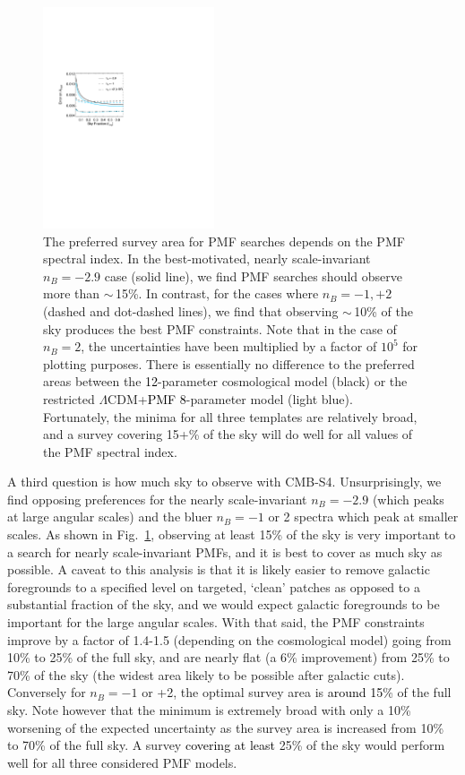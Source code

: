 \documentclass[apj]{emulateapj}
\newcommand{\lcdm}{\ensuremath{\Lambda}CDM}
\newcommand{\changed}[1]{\textcolor{Black}{#1}}
\begin{document}
\begin{figure}[htb]\centering
\includegraphics[width=0.45\textwidth,clip,trim={2.cm 12.5cm 11cm 7.5cm}]{pmf_area.pdf}
  \caption[Area dependence]{
  The preferred survey area for PMF searches depends on the PMF spectral index. 
    In the best-motivated, nearly scale-invariant $n_B = -2.9$ case (solid line), we find PMF searches should observe more than $\sim$\,15\%. 
 In contrast, for the cases where $n_B = -1, +2$ (dashed and dot-dashed lines), we find that observing  $\sim$\,10\% of the sky produces the best PMF constraints. 
   Note that in the case of $n_B=2$, the uncertainties have been multiplied by a factor of $10^5$ for plotting purposes. 
   There is essentially no difference to the preferred areas between the \changed{12}-parameter cosmological model (black) or the restricted \lcdm{}+\changed{PMF 8}-parameter model (light blue). 
     Fortunately, the minima for all three templates are relatively broad, and a survey covering 15+\% of the sky will do well for all values of the PMF spectral index. 
    \label{fig:area}
  }
\end{figure}


A third question is how much sky to observe with CMB-S4. 
Unsurprisingly, we find opposing preferences for the nearly scale-invariant $n_B=-2.9$ (which peaks at large angular scales) and the bluer $n_B=-1$ or 2 spectra which peak at smaller scales. 
As shown in  Fig.~\ref{fig:area}, observing at least 15\% of the sky is very important to a search for nearly scale-invariant PMFs, and it is best  to cover as much sky as possible. 
A caveat to this analysis is that it is likely easier to remove galactic foregrounds to a specified level on targeted, `clean' patches as opposed to a substantial fraction of the sky, and we would expect galactic foregrounds to be important for the large angular scales. 
With that said, the PMF constraints improve by a factor of 1.4-1.5 (depending on the cosmological model) going from 10\% to 25\% of the full sky, and are nearly flat (a 6\% improvement) from 25\% to 70\% of the sky (the widest area likely to be possible after galactic cuts).
Conversely for $n_B=-1$ or +2, the optimal survey area is \changed{around 15}\% of the full sky. 
Note however that the minimum is extremely broad with only a 10\% worsening of the expected uncertainty as the survey area is increased from 10\% to 70\% of the  full sky. 
A survey \changed{ covering at least} 25\% of the sky would perform well for all three considered PMF models. 
\end{document}
